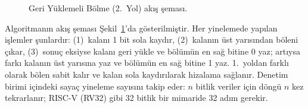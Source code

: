 \begin{figure}[htbp]
\caption[Geri Y{\"u}klemeli B{\"o}lme (2.\ Yol) ak{\i}{\c{s}} {\c{s}}emas{\i}]{Geri Y{\"u}klemeli B{\"o}lme (2.\ Yol) ak{\i}{\c{s}} {\c{s}}emas{\i}.}
\label{fig:bolme-2yol-algo}
\end{figure}

Algoritmanın akış şeması Şekil~\ref{fig:bolme-2yol-algo}'da gösterilmiştir. Her yinelemede yapılan işlemler şunlardır: (1)~kalanı 1 bit sola kaydır, (2)~kalanın üst yarısından böleni çıkar, (3)~sonuç eksiyse kalanı geri yükle ve bölümün en sağ bitine 0 yaz; artıysa farkı kalanın üst yarısına yaz ve bölümün en sağ bitine 1 yaz. 1.\ yoldan farklı olarak bölen sabit kalır ve kalan sola kaydırılarak hizalama sağlanır. Denetim birimi içindeki sayaç yineleme sayısını takip eder: $n$ bitlik veriler için döngü $n$ kez tekrarlanır; RISC-V (RV32) gibi 32 bitlik bir mimaride 32 adım gerekir.

